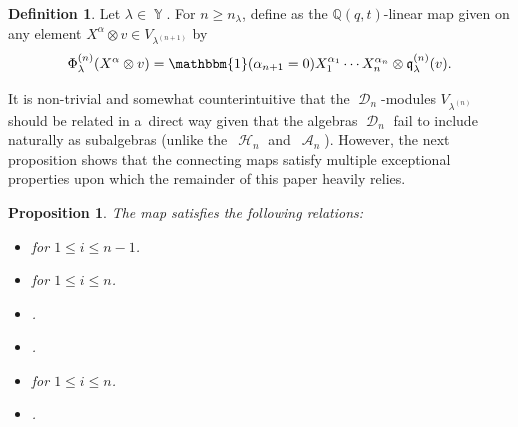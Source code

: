 \documentclass[pdftex]{sigma}
\numberwithin{equation}{section}
\newtheorem{Proposition}[Theorem]{Proposition}
\theoremstyle{definition}
\newtheorem{Definition}[Theorem]{Definition}
\DeclareMathOperator{\Par}{\mathbb{Y}}
\DeclareMathOperator{\sH}{\mathscr{H}}
\DeclareMathOperator{\sA}{\mathscr{A}}
\DeclareMathOperator{\sD}{\mathscr{D}}
\begin{document}
\begin{Definition}\label{connecting maps def}
 Let $\lambda \in \Par$. For $n \geq n_{\lambda}$, define  as the $\mathbb{Q}(q,t)$-linear map given on any element $X^{\alpha}\otimes v \in V_{\lambda^{(n+1)}}$ by
 \[
 \Phi^{(n)}_{\lambda}(X^{\alpha}\otimes v) = \mathbbm{1}(\alpha_{n+1} = 0) X_1^{\alpha_1}\cdots X_n^{\alpha_n}\otimes \mathfrak{q}^{(n)}_{\lambda}(v).
 \]

\end{Definition}

 It is non-trivial and somewhat counterintuitive that the $\sD_n$-modules $V_{\lambda^{(n)}}$ should be related in a~direct way given that the algebras $\sD_n$ fail to include naturally as subalgebras (unlike the~$\sH_n$ and~$\sA_n$). However, the next proposition shows that the connecting maps  satisfy multiple exceptional properties upon which the remainder of this paper heavily relies.

\begin{Proposition}\label{relations for connecting maps}
 The map  satisfies the following relations:
 \begin{itemize}
\itemsep=0pt
 \item {} for $1\leq i \leq n-1$.
 \item {} for $1\leq i \leq n$.
 \item {}.
 \item {}.
 \item {} for $1\leq i \leq n$.
 \item {}.
 \end{itemize}
\end{Proposition}
\end{document}
